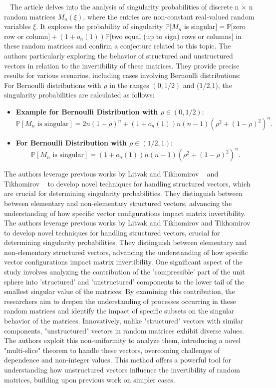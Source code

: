 ~\cite{jain2021singularity}
The article delves into the analysis of singularity probabilities of discrete n $\times$ n random matrices ${M_n}(\xi)$, where the entries are non-constant real-valued random variables $\xi$. 
It explores the probability of singularity $ \mathbb{P}[M_n$ is singular$]=\mathbb{P}[$zero row or column$]+ (1+o_n(1))\mathbb{P}[$two equal (up to sign) rows or columns$]$ in these random matrices and confirm a conjecture related to this topic. 
The authors particularly exploring the behavior of structured and unstructured vectors in relation to the invertibility of these matrices. 
They provide precise results for various scenarios, including cases involving Bernoulli distributions:\\
For Bernoulli distributions with $\rho$ in the ranges $(0,1/2)$ and (1/2,1), the singularity probabilities are calculated as follows:
\begin{itemize}
    \item \textbf{Example for Bernoulli Distribution with $\rho \in (0, 1/2)$}:
    \[
    \mathbb{P}[M_n \text{ is singular}] = 2n(1-\rho)^n + (1+o_n(1))n(n-1)(\rho^2+(1-\rho)^2)^n.
    \]
    \item \textbf{For Bernoulli Distribution with $\rho \in (1/2, 1)$}:
    \[
    \mathbb{P}[M_n \text{ is singular}] = (1+o_n(1))n(n-1)(\rho^2+(1-\rho)^2)^n.
    \]
\end{itemize}

The authors leverage previous works by Litvak and Tikhomirov ~\cite{litvak2022singularity} and Tikhomirov ~\cite{tikhomirov2020singularity} to develop novel techniques for handling structured vectors, which are crucial for determining singularity probabilities.
They distinguish between between elementary and non-elementary structured vectors, advancing the understanding of how specific vector configurations impact matrix invertibility.
The authors leverage previous works by Litvak and Tikhomirov and Tikhomirov to develop novel techniques for handling structured vectors, crucial for determining singularity probabilities. They distinguish between elementary and non-elementary structured vectors, advancing the understanding of how specific vector configurations impact matrix invertibility.
One significant aspect of the study involves analyzing the contribution of the 'compressible' part of the unit sphere into 'structured' and 'unstructured' components to the lower tail of the smallest singular value of the matrices. By examining this contribution, the researchers aim to deepen the understanding of processes occurring in these random matrices and identify the impact of specific subsets on the singular behavior of the matrices.
Innovatively, unlike "structured" vectors with similar components, "unstructured" vectors in random matrices exhibit diverse values. The authors exploit this non-uniformity to analyze them, introducing a novel "multi-slice" theorem to handle these vectors, overcoming challenges of dependence and non-integer values. This method offers a powerful tool for understanding how unstructured vectors influence the invertibility of random matrices, building upon previous work on simpler cases.
